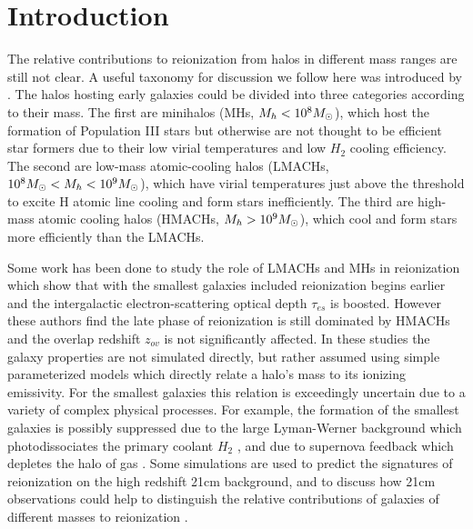 \documentclass[iop,apj]{emulateapj}
\begin{document}

\section{Introduction}
The relative contributions to reionization from halos in different mass ranges are still not clear. A useful taxonomy for discussion we follow here was introduced by \cite{Iliev07}. The halos hosting early galaxies could be divided into three categories according to their mass. The first are minihalos (MHs, $M_h <10^8M_\odot$), which host the formation of Population III stars but otherwise are not thought to be efficient star formers due to their low virial temperatures and low $H_2$ cooling efficiency. The second are low-mass atomic-cooling halos (LMACHs, $10^8M_\odot<M_h<10^9M_\odot$), which have virial temperatures just above the threshold to excite H atomic line cooling and form stars inefficiently. The third are high-mass atomic cooling halos (HMACHs, $M_h>10^9M_\odot$), which cool and form stars more efficiently than the LMACHs. 

Some work has been done to study the role of LMACHs and MHs in reionization \citep{Iliev07, Choudhury08, Shapiro12, Iliev12, Ahn12, Wyithe13} which show that with the smallest galaxies included reionization begins earlier and the intergalactic electron-scattering optical depth $\tau_{es}$ is boosted. However these authors find the late phase of reionization is still dominated by HMACHs and the overlap redshift $z_{ov}$ is not significantly affected. In these studies the galaxy properties are not simulated directly, but rather assumed using simple parameterized models which directly relate a halo's mass to its ionizing emissivity. For the smallest galaxies this relation is exceedingly uncertain due to a variety of complex physical processes. For example, the formation of the smallest galaxies is possibly suppressed due to the large Lyman-Werner background which photodissociates the primary coolant $H_2$ \citep{Ahn12}, and due to supernova feedback which depletes the halo of gas \citep{Wyithe13}. Some simulations are used to predict the signatures of reionization on the high redshift 21cm background, and to discuss how 21cm observations could help to distinguish the relative contributions of galaxies of different masses to reionization \citep{Shapiro12, Iliev12}.
\end{document}
